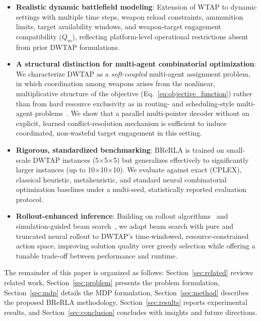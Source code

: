 \documentclass{ieeeaccess}
\begin{document}
\begin{itemize}
    \item \textbf{Realistic dynamic battlefield modeling}: Extension of WTAP to dynamic settings with multiple time steps, weapon reload constraints, ammunition limits, target availability windows, and weapon-target engagement compatibility ($Q_m$), reflecting platform-level operational restrictions absent from prior DWTAP formulations.

    \item \textbf{A structural distinction for multi-agent combinatorial optimization}: We characterize DWTAP as a \emph{soft-coupled} multi-agent assignment problem, in which coordination among weapons arises from the nonlinear, multiplicative structure of the objective (Eq.~\eqref{eq:objective_function}) rather than from hard resource exclusivity as in routing- and scheduling-style multi-agent problems~\cite{parco2024}. We show that a parallel multi-pointer decoder without an explicit, learned conflict-resolution mechanism is sufficient to induce coordinated, non-wasteful target engagement in this setting.

    \item \textbf{Rigorous, standardized benchmarking}: BReRLA is trained on small-scale DWTAP instances (5×5×5) but generalizes effectively to significantly larger instances (up to 10×10×10). We evaluate against exact (CPLEX), classical heuristic, metaheuristic, and standard neural combinatorial optimization baselines under a multi-seed, statistically reported evaluation protocol.

    \item \textbf{Rollout-enhanced inference}: Building on rollout algorithms~\cite{bertsekas1997rollout} and simulation-guided beam search~\cite{choo2022sgbs}, we adapt beam search with pure and truncated neural rollout to DWTAP's time-windowed, resource-constrained action space, improving solution quality over greedy selection while offering a tunable trade-off between performance and runtime.
\end{itemize}

The remainder of this paper is organized as follows: Section~\ref{sec:related} reviews related work, Section~\ref{sec:problem} presents the problem formulation, Section~\ref{sec:mdp} details the MDP formulation, Section~\ref{sec:method} describes the proposed BReRLA methodology, Section~\ref{sec:results} reports experimental results, and Section~\ref{sec:conclusion} concludes with insights and future directions.
\end{document}
